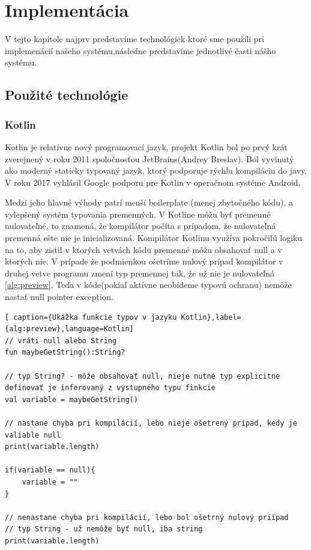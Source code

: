 \section{Implementácia}  
V tejto kapitole najprv predstavíme technológiek ktoré sme použili pri implemenácií našeho systému,následne predstavíme jednotlivé časti nášho systému.

\subsection{Použité technológie}  

\subsubsection{Kotlin}  
Kotlin je relatívne nový programovací jazyk, projekt Kotlin bol po prvý krát zverejnený v roku 2011 spoločnosťou JetBrains(Andrey Breslav). Bol vyvinutý ako moderný staticky typovaný jazyk, ktorý podporuje rýchlu kompiláciu do javy. V roku 2017 vyhlásil Google podporu pre Kotlin v operačnom systéme Android.   

Medzi jeho hlavné výhody patrí menší boilerplate (menej zbytočného kódu), a vylepšený systém typovania premenných. V Kotline  môžu byť premenné nulovateľné, to znamená, že kompilátor počíta s prípadom, že nulovateľná premenná ešte nie je inicializovaná. Kompilátor Kotlinu využíva pokročilú logiku na to, aby zistil v ktorých vetvách kódu premenné môžu obsahovať null a v ktorých nie. V prípade že podmienkou ošetríme nulový prípad kompilátor v druhej vetve programu zmení typ premennej tak, že už nie je nulovateľná \ref{alg:preview}. Teda v kóde(pokiaľ aktívne neobídeme typovú ochranu) nemôže nastať null pointer exception. 


\begin{lstlisting}[ caption={Ukážka funkcie typov v jazyku Kotlin},label={alg:preview},language=Kotlin] 
// vráti null alebo String 
fun maybeGetString():String? 

// typ String? - môže obsahovať null, nieje nutné typ explicitne definovať je inferovaný z výstupného typu finkcie
val variable = maybeGetString() 

// nastane chyba pri kompilácií, lebo nieje ošetrený prípad, kedy je valiable null 
print(variable.length) 

if(variable == null){ 
	variable = "" 
} 

// nenastane chyba pri kompilácií, lebo bol ošetrný nulový priípad
// typ String - už nemôže byť null, iba string
print(variable.length)  
\end{lstlisting} 


